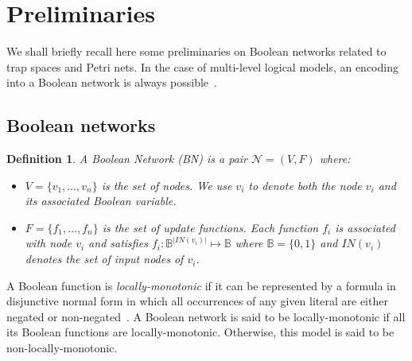 \documentclass[preprint,12pt]{elsarticle}
\newtheorem{definition}{Definition}[section]
\begin{document}
\section{Preliminaries}
\label{sec:Preliminaries}

We shall briefly recall here some preliminaries on Boolean networks related to trap spaces and Petri nets.
In the case of multi-level logical models, an encoding into a Boolean network is always possible~\cite{Didier2011}.

\subsection{Boolean networks}

\begin{definition}

  A Boolean Network (BN) is a pair \(\mathcal{N} = (V, F)\) where:
  \begin{itemize}
    \item \(V = \{v_1, \dots, v_n\}\) is the set of nodes.
    We use \(v_i\) to denote both the node \(v_i\) and its associated Boolean variable.
    
    \item \(F = \{f_1, \dots, f_n\}\) is the set of update functions.
    Each function \(f_i\) is associated with node \(v_i\) and satisfies \(f_i \colon \mathbb{B}^{\vert IN(v_i)\vert} \mapsto \mathbb{B}\) where \(\mathbb{B} = \{0, 1\}\) and \(IN(v_i)\) denotes the set of input nodes of \(v_i\).
  \end{itemize}

\label{def:BN}
\end{definition}

A Boolean function is \emph{locally-monotonic} if it can be represented by a formula in disjunctive normal form in which all occurrences of any given literal are either negated or non-negated~\cite{Paulev2020}.
A Boolean network is said to be locally-monotonic if all its Boolean functions are locally-monotonic. 
Otherwise, this model is said to be non-locally-monotonic.
\end{document}
